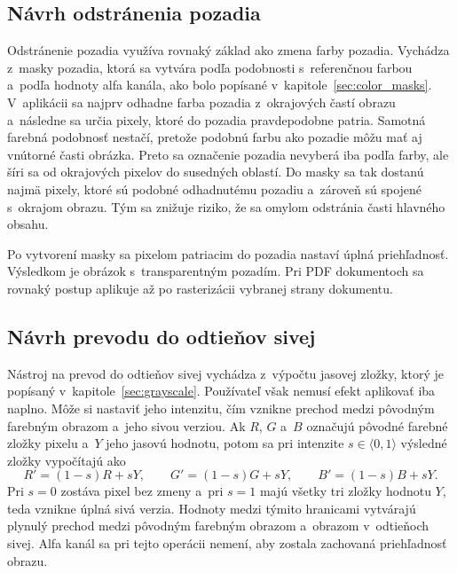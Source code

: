 \subsection{Návrh odstránenia pozadia}

Odstránenie pozadia využíva rovnaký základ ako zmena farby pozadia. Vychádza z~masky pozadia, ktorá sa vytvára podľa podobnosti s~referenčnou farbou a~podľa hodnoty alfa kanála, ako bolo popísané v~kapitole~\ref{sec:color_masks}. V~aplikácii sa najprv odhadne farba pozadia z~okrajových častí obrazu a~následne sa určia pixely, ktoré do pozadia pravdepodobne patria. Samotná farebná podobnosť nestačí, pretože podobnú farbu ako pozadie môžu mať aj vnútorné časti obrázka. Preto sa označenie pozadia nevyberá iba podľa farby, ale šíri sa od okrajových pixelov do susedných oblastí. Do masky sa tak dostanú najmä pixely, ktoré sú podobné odhadnutému pozadiu a~zároveň sú spojené s~okrajom obrazu. Tým sa znižuje riziko, že sa omylom odstránia časti hlavného obsahu.

Po vytvorení masky sa pixelom patriacim do pozadia nastaví úplná priehľadnosť. Výsledkom je obrázok s~transparentným pozadím. Pri PDF dokumentoch sa rovnaký postup aplikuje až po rasterizácii vybranej strany dokumentu.

\subsection{Návrh prevodu do odtieňov sivej}

Nástroj na prevod do odtieňov sivej vychádza z~výpočtu jasovej zložky, ktorý je popísaný v~kapitole~\ref{sec:grayscale}. Používateľ však nemusí efekt aplikovať iba naplno. Môže si nastaviť jeho intenzitu, čím vznikne prechod medzi pôvodným farebným obrazom a~jeho sivou verziou. Ak \(R\), \(G\) a~\(B\) označujú pôvodné farebné zložky pixelu a~\(Y\) jeho jasovú hodnotu, potom sa pri intenzite \(s\in\langle0,1\rangle\) výsledné zložky vypočítajú ako
\begin{equation}
    R'=(1-s)R+sY,\qquad
    G'=(1-s)G+sY,\qquad
    B'=(1-s)B+sY.
\end{equation}
Pri \(s=0\) zostáva pixel bez zmeny a~pri \(s=1\) majú všetky tri zložky hodnotu \(Y\), teda vznikne úplná sivá verzia. Hodnoty medzi týmito hranicami vytvárajú plynulý prechod medzi pôvodným farebným obrazom a~obrazom v~odtieňoch sivej. Alfa kanál sa pri tejto operácii nemení, aby zostala zachovaná priehľadnosť obrazu.

